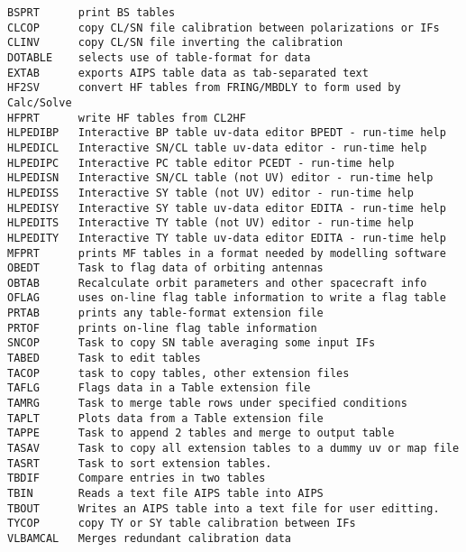
\vskip 0.5pt
\bbve\begin{verbatim}
BSPRT      print BS tables
CLCOP      copy CL/SN file calibration between polarizations or IFs
CLINV      copy CL/SN file inverting the calibration
DOTABLE    selects use of table-format for data
EXTAB      exports AIPS table data as tab-separated text
HF2SV      convert HF tables from FRING/MBDLY to form used by Calc/Solve
HFPRT      write HF tables from CL2HF
HLPEDIBP   Interactive BP table uv-data editor BPEDT - run-time help
HLPEDICL   Interactive SN/CL table uv-data editor - run-time help
HLPEDIPC   Interactive PC table editor PCEDT - run-time help
HLPEDISN   Interactive SN/CL table (not UV) editor - run-time help
HLPEDISS   Interactive SY table (not UV) editor - run-time help
HLPEDISY   Interactive SY table uv-data editor EDITA - run-time help
HLPEDITS   Interactive TY table (not UV) editor - run-time help
HLPEDITY   Interactive TY table uv-data editor EDITA - run-time help
MFPRT      prints MF tables in a format needed by modelling software
OBEDT      Task to flag data of orbiting antennas
OBTAB      Recalculate orbit parameters and other spacecraft info
OFLAG      uses on-line flag table information to write a flag table
PRTAB      prints any table-format extension file
PRTOF      prints on-line flag table information
SNCOP      Task to copy SN table averaging some input IFs
TABED      Task to edit tables
TACOP      task to copy tables, other extension files
TAFLG      Flags data in a Table extension file
TAMRG      Task to merge table rows under specified conditions
TAPLT      Plots data from a Table extension file
TAPPE      Task to append 2 tables and merge to output table
TASAV      Task to copy all extension tables to a dummy uv or map file
TASRT      Task to sort extension tables.
TBDIF      Compare entries in two tables
TBIN       Reads a text file AIPS table into AIPS
TBOUT      Writes an AIPS table into a text file for user editting.
TYCOP      copy TY or SY table calibration between IFs
VLBAMCAL   Merges redundant calibration data
\end{verbatim}\eve

\vfill\eject
{}

